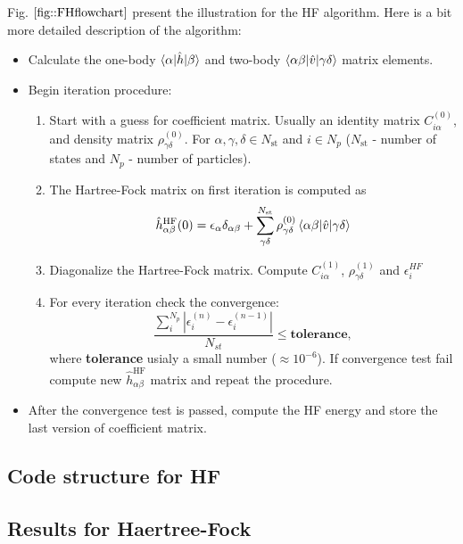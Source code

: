 \documentclass[twoside,english]{uiofysmaster}
\theoremstyle{definition}
\begin{document}
Fig. $\ref{fig::FHflowchart}$ present the illustration for the HF algorithm. Here is a bit more detailed description of the algorithm:
\begin{tcolorbox}
	\begin{itemize}
		\item Calculate the one-body $\braket{\alpha|\hat{h}|\beta}$ and two-body $\braket{\alpha\beta|\hat{v}|\gamma\delta}$ matrix elements.  \\
		\item Begin iteration procedure:
		\begin{enumerate}
			\item Start with a guess for coefficient matrix. Usually an identity matrix $C^{(0)}_{i\alpha}$,  and density matrix $\rho^{(0)}_{\gamma\delta}$. For $\alpha, \gamma, \delta \in N_{\text{st}}$ and $i \in N_{p}$ ($N_{\text{st}}$ - number of states and $N_{p}$ - number of particles). 
			\item The Hartree-Fock matrix on first iteration is computed as 
			 \[ \hat{h}^{\text{HF}}_{\alpha \beta}(0) = \epsilon_\alpha \delta_{\alpha\beta} + \sum_{\gamma\delta}^{N_{\text{st}}} \rho^{(0)}_{\gamma\delta} \braket{\alpha\beta|\hat{v}|\gamma\delta}  \] 
			 \item Diagonalize the Hartree-Fock matrix. Compute  $C^{(1)}_{i\alpha}$,   $\rho^{(1)}_{\gamma\delta}$ and $\epsilon_i^{HF}$
			 \item For every iteration check the convergence:
			 \[\frac{\sum_{i}^{N_p} |\epsilon_i^{(n)}- \epsilon_i^{(n-1)}|}{N_{st}} \leq \textbf{tolerance},\]
			 where \textbf{tolerance} usialy a small number ($\approx 10^{-6}$). If convergence test fail compute new $\hat{h}^{\text{HF}}_{\alpha \beta}$ matrix and repeat the procedure.			 	
		\end{enumerate} 
		\item After the convergence test is passed, compute the HF energy and store the last version of coefficient matrix. 
	\end{itemize}
\end{tcolorbox}

\subsection{Code structure for HF}\label{sec:code_for_HF}
\subsection{Results for Haertree-Fock}
\end{document}
